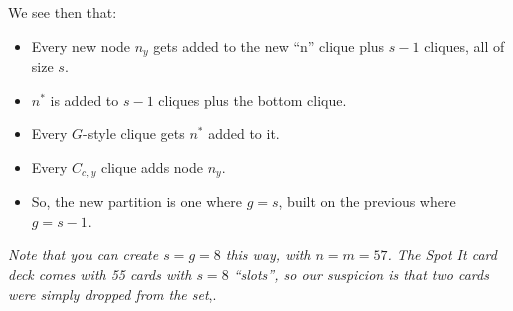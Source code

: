 \documentclass[11pt, oneside]{article} 	%
\begin{document}
We see then that:

\begin{itemize}
\item Every new node $n_y$ gets added to the new ``n'' clique plus $s-1$ cliques, all of size $s$.
\item $n^*$ is added to $s-1$ cliques plus the bottom clique.
\item Every $G$-style clique gets $n^*$ added to it.
\item Every $C_{c,y}$ clique adds node $n_y$.
\item So, the new partition is one where $g=s$, built on the previous where $g=s-1$.
\end{itemize}

\emph{Note that you can create $s=g=8$ this way, with $n=m=57$. The Spot It card deck comes with 55 cards with $s=8$ ``slots'', so our suspicion is that two cards were simply dropped from the set},.
\end{document}
